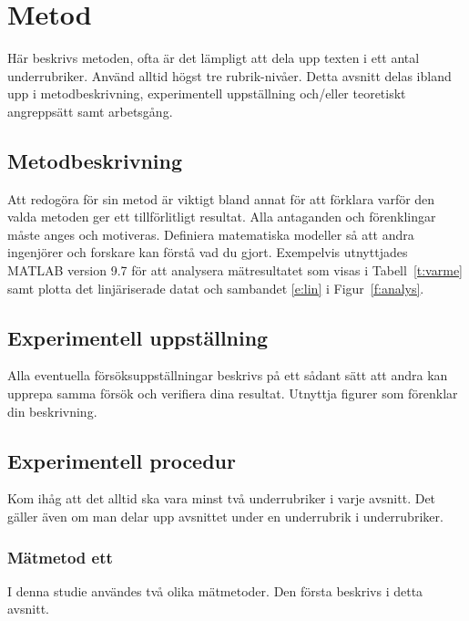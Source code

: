 \documentclass[a4paper]{article}
\begin{document}
\newpage
\section{Metod}\label{s:metod}

Här beskrivs metoden, ofta är det lämpligt att dela upp texten i ett antal underrubriker. Använd alltid högst tre rubrik-nivåer.
Detta avsnitt delas ibland upp i metodbeskrivning, experimentell uppställning och/eller teoretiskt angreppsätt samt arbetsgång.

\subsection{Metodbeskrivning}
Att redogöra för sin metod är viktigt bland annat för att förklara varför den valda metoden ger ett tillförlitligt resultat. Alla antaganden och förenklingar måste anges och motiveras. Definiera matematiska modeller så att andra ingenjörer och forskare kan förstå vad du gjort.
Exempelvis utnyttjades MATLAB version 9.7 \cite{MATLAB2019} för att analysera mätresultatet som visas i Tabell~\ref{t:varme} samt plotta det linjäriserade datat och sambandet \eqref{e:lin} i Figur~\ref{f:analys}.

\subsection{Experimentell uppställning}

Alla eventuella försöksuppställningar beskrivs på ett sådant sätt att andra kan upprepa samma försök och verifiera dina resultat. Utnyttja figurer som förenklar din beskrivning.

\subsection{Experimentell procedur}
Kom ihåg att det alltid ska vara minst två underrubriker i varje avsnitt. Det gäller även om man delar upp avsnittet under en underrubrik i underrubriker.

\subsubsection{Mätmetod ett}
I denna studie användes två olika mätmetoder. Den första beskrivs i detta avsnitt.
\end{document}

